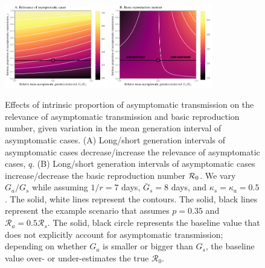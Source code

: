 \begin{figure}[b!]
\begin{center}
\includegraphics[width=0.4\textwidth]{figheatmap.pdf}
\mbox{\hspace{0.05\textwidth}}
\includegraphics[width=0.4\textwidth]{figheatmap_R0.pdf}
\caption{Effects of intrinsic proportion of asymptomatic transmission on the relevance of asymptomatic transmission and basic reproduction number, given variation in
the mean generation interval of asymptomatic cases. 
(A) Long/short generation intervals of asymptomatic cases decrease/increase the relevance of asymptomatic cases, $q$.
(B) Long/short generation intervals of asymptomatic cases increase/decrease the basic reproduction number ${\cal{R}}_0$.
We vary $G_a/G_s$ while assuming $1/r=7$ days, $\bar G_s=8$ days, and $\kappa_s=\kappa_a=0.5$.
The solid, white lines represent the contours.
The solid, black lines represent the example scenario that assumes $p = 0.35$ and $\mathcal R_a = 0.5 \mathcal R_s$.
The solid, black circle represents the baseline value that does not explicitly account for asymptomatic transmission; depending on whether $G_a$ is smaller or bigger than $G_s$, the baseline value over- or under-estimates the true $\mathcal R_0$.
\label{fig.relevance}}
\end{center}
\end{figure}

